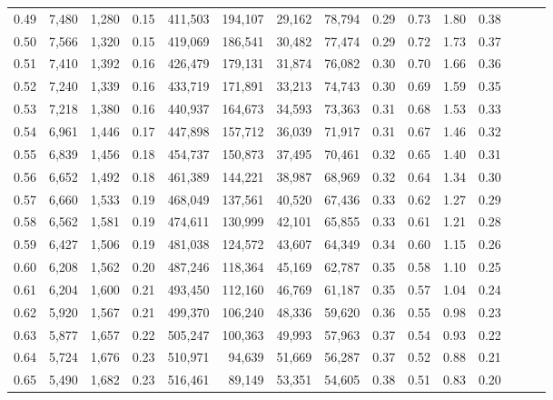 \begin{tabular}{rrrrrrrrrrrrrrr}
0.49 &  7,480 &  1,280 &  0.15 &  411,503 &  194,107 &   29,162 &   78,794 &  0.29 &  0.73 &  1.80 &      0.38 \\
0.50 &  7,566 &  1,320 &  0.15 &  419,069 &  186,541 &   30,482 &   77,474 &  0.29 &  0.72 &  1.73 &      0.37 \\
0.51 &  7,410 &  1,392 &  0.16 &  426,479 &  179,131 &   31,874 &   76,082 &  0.30 &  0.70 &  1.66 &      0.36 \\
0.52 &  7,240 &  1,339 &  0.16 &  433,719 &  171,891 &   33,213 &   74,743 &  0.30 &  0.69 &  1.59 &      0.35 \\
0.53 &  7,218 &  1,380 &  0.16 &  440,937 &  164,673 &   34,593 &   73,363 &  0.31 &  0.68 &  1.53 &      0.33 \\
0.54 &  6,961 &  1,446 &  0.17 &  447,898 &  157,712 &   36,039 &   71,917 &  0.31 &  0.67 &  1.46 &      0.32 \\
0.55 &  6,839 &  1,456 &  0.18 &  454,737 &  150,873 &   37,495 &   70,461 &  0.32 &  0.65 &  1.40 &      0.31 \\
0.56 &  6,652 &  1,492 &  0.18 &  461,389 &  144,221 &   38,987 &   68,969 &  0.32 &  0.64 &  1.34 &      0.30 \\
0.57 &  6,660 &  1,533 &  0.19 &  468,049 &  137,561 &   40,520 &   67,436 &  0.33 &  0.62 &  1.27 &      0.29 \\
0.58 &  6,562 &  1,581 &  0.19 &  474,611 &  130,999 &   42,101 &   65,855 &  0.33 &  0.61 &  1.21 &      0.28 \\
0.59 &  6,427 &  1,506 &  0.19 &  481,038 &  124,572 &   43,607 &   64,349 &  0.34 &  0.60 &  1.15 &      0.26 \\
0.60 &  6,208 &  1,562 &  0.20 &  487,246 &  118,364 &   45,169 &   62,787 &  0.35 &  0.58 &  1.10 &      0.25 \\
0.61 &  6,204 &  1,600 &  0.21 &  493,450 &  112,160 &   46,769 &   61,187 &  0.35 &  0.57 &  1.04 &      0.24 \\
0.62 &  5,920 &  1,567 &  0.21 &  499,370 &  106,240 &   48,336 &   59,620 &  0.36 &  0.55 &  0.98 &      0.23 \\
0.63 &  5,877 &  1,657 &  0.22 &  505,247 &  100,363 &   49,993 &   57,963 &  0.37 &  0.54 &  0.93 &      0.22 \\
0.64 &  5,724 &  1,676 &  0.23 &  510,971 &   94,639 &   51,669 &   56,287 &  0.37 &  0.52 &  0.88 &      0.21 \\
0.65 &  5,490 &  1,682 &  0.23 &  516,461 &   89,149 &   53,351 &   54,605 &  0.38 &  0.51 &  0.83 &      0.20 \\

\end{tabular}
